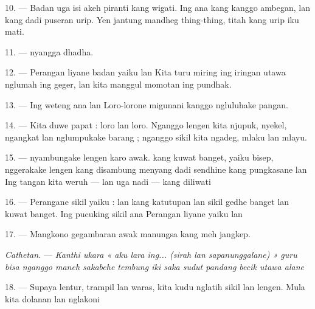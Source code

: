 10. --- Badan uga isi akeh piranti kang wigati. Ing  ana
 kang kanggo ambegan, lan  kang dadi
puseran urip. Yen jantung mandheg thing-thing, titah kang urip iku
mati.

11. ---  nyangga dhadha.

12. --- Perangan liyane badan yaiku  
 lan  Kita turu miring ing iringan utawa
nglumah ing geger, lan kita manggul momotan ing pundhak.

13. --- Ing weteng ana  lan  Loro-lorone
migunani kanggo ngluluhake pangan.

\VUsaut{4.4mm}
\VUsaut{3.0mm}

14. --- Kita duwe  papat :  loro lan
 loro. Nganggo lengen kita njupuk, nyekel, ngangkat lan
nglumpukake barang ; nganggo sikil kita ngadeg, mlaku lan mlayu.

15. ---  nyambungake lengen karo awak. 
kang kuwat banget, yaiku bisep, nggerakake lengen kang disambung
 menyang   dadi
sendhine  kang pungkasane  lan
 Ing tangan kita weruh  — lan uga
nadi — kang diliwati 

16. --- Perangane sikil yaiku :   lan
  kang 
katutupan   lan 
 sikil gedhe banget lan kuwat banget. Ing pucuking sikil
ana  Perangan liyane yaiku 
lan 

17. --- Mangkono gegambaran awak manungsa kang meh jangkep.

\textit{Cathetan.} --- \textit{Kanthi ukara « aku lara ing... (sirah lan
sapanunggalane) » guru bisa nganggo maneh sakabehe tembung iki saka
sudut pandang becik utawa alane} 

\VUsaut{5.0mm}
\VUsaut{2.4mm}
\VUsaut{3.0mm}

18. --- Supaya lentur, trampil lan waras, kita kudu nglatih sikil lan
lengen. Mula kita dolanan lan nglakoni 


